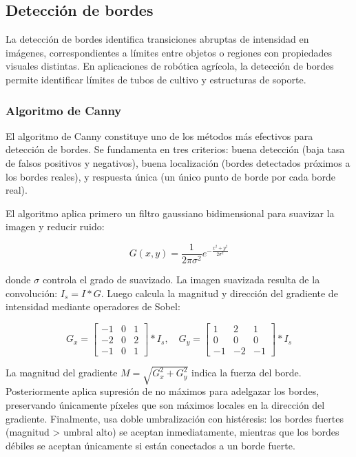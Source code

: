 \subsection{Detección de bordes}

La detección de bordes identifica transiciones abruptas de intensidad en imágenes, correspondientes a límites entre objetos o regiones con propiedades visuales distintas. En aplicaciones de robótica agrícola, la detección de bordes permite identificar límites de tubos de cultivo y estructuras de soporte.

\subsubsection{Algoritmo de Canny}

El algoritmo de Canny constituye uno de los métodos más efectivos para detección de bordes. Se fundamenta en tres criterios: buena detección (baja tasa de falsos positivos y negativos), buena localización (bordes detectados próximos a los bordes reales), y respuesta única (un único punto de borde por cada borde real).

El algoritmo aplica primero un filtro gaussiano bidimensional para suavizar la imagen y reducir ruido:

\begin{equation}
G(x,y) = \frac{1}{2\pi\sigma^2} e^{-\frac{x^2 + y^2}{2\sigma^2}}
\end{equation}

donde $\sigma$ controla el grado de suavizado. La imagen suavizada resulta de la convolución: $I_s = I \ast G$. Luego calcula la magnitud y dirección del gradiente de intensidad mediante operadores de Sobel:

\begin{equation}
G_x = \begin{bmatrix} -1 & 0 & 1 \\ -2 & 0 & 2 \\ -1 & 0 & 1 \end{bmatrix} \ast I_s, \quad G_y = \begin{bmatrix} 1 & 2 & 1 \\ 0 & 0 & 0 \\ -1 & -2 & -1 \end{bmatrix} \ast I_s
\end{equation}

La magnitud del gradiente $M = \sqrt{G_x^2 + G_y^2}$ indica la fuerza del borde. Posteriormente aplica supresión de no máximos para adelgazar los bordes, preservando únicamente píxeles que son máximos locales en la dirección del gradiente. Finalmente, usa doble umbralización con histéresis: los bordes fuertes (magnitud > umbral alto) se aceptan inmediatamente, mientras que los bordes débiles se aceptan únicamente si están conectados a un borde fuerte.
